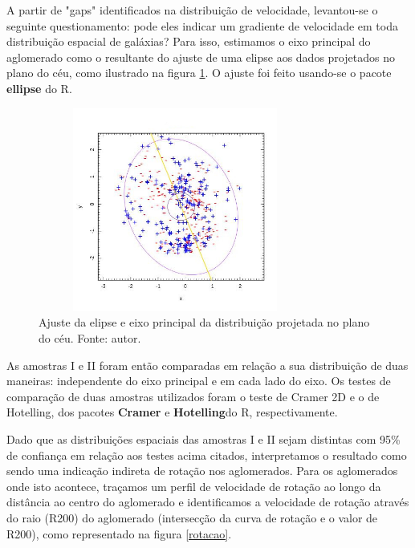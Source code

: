 A partir de "gaps" identificados na distribuição de velocidade, levantou-se o seguinte questionamento: pode eles indicar um gradiente de velocidade em toda distribuição espacial de galáxias? Para isso, estimamos o eixo principal do aglomerado como o resultante do ajuste de uma elipse aos dados projetados no plano do céu, como ilustrado na figura \ref{elipse}. O ajuste foi feito usando-se o pacote \textbf{ellipse} do R.

\begin{figure}[!htbp] %
\vspace{-2pt}
\begin{center}
\includegraphics[height=6.7cm,width=9cm]{04-figuras/elipse}%
\caption{Ajuste da elipse e eixo principal da distribuição projetada no plano do céu. Fonte: autor.}
\label{elipse}%
\end{center}
\end{figure}

As amostras I e II foram então comparadas em relação a sua distribuição de duas maneiras: independente do eixo principal e em cada lado do eixo.
Os testes de comparação de duas amostras utilizados foram o teste de Cramer 2D e o de Hotelling, dos pacotes \textbf{ Cramer} e \textbf{ Hotelling}do R, respectivamente. 

Dado que as distribuições espaciais das amostras  I e II sejam distintas com 95\% de confiança em relação aos testes acima citados, interpretamos o resultado como sendo uma indicação indireta de rotação nos aglomerados. Para os aglomerados onde isto acontece, traçamos um perfil de velocidade
de rotação ao longo da distância ao centro do aglomerado e identificamos a velocidade de rotação através do raio (R200) do aglomerado (intersecção da curva de rotação e o valor de R200), como representado na figura \ref{rotacao}.

